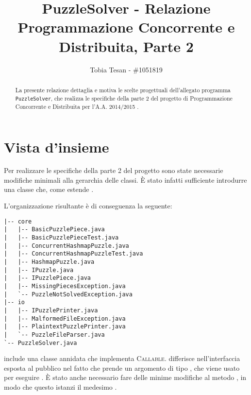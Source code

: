 \documentclass[a4paper]{article}
\title{PuzzleSolver - Relazione Programmazione Concorrente e Distribuita, Parte 2}
\author{Tobia Tesan - \#1051819}
\newcommand{\Ifacename}[1]{\textsc{#1}}
\begin{document}
\maketitle

\begin{abstract}
La presente relazione dettaglia e motiva le scelte progettuali dell'allegato programma \texttt{PuzzleSolver}, che realizza le specifiche della parte 2 del progetto di Programmazione Concorrente e Distribuita per l'A.A. 2014/2015 \cite{prspec}.
\end{abstract}

\tableofcontents

\section{Vista d'insieme}

Per realizzare le specifiche della parte 2 del progetto sono state necessarie modifiche minimali alla gerarchia delle classi.
\`E stato infatti sufficiente introdurre una classe  che, come  estende .

L'organizzazione risultante \`e di conseguenza la seguente:

\begin{verbatim}
|-- core
|   |-- BasicPuzzlePiece.java
|   |-- BasicPuzzlePieceTest.java
|   |-- ConcurrentHashmapPuzzle.java
|   |-- ConcurrentHashmapPuzzleTest.java
|   |-- HashmapPuzzle.java
|   |-- IPuzzle.java
|   |-- IPuzzlePiece.java
|   |-- MissingPiecesException.java
|   `-- PuzzleNotSolvedException.java
|-- io
|   |-- IPuzzlePrinter.java
|   |-- MalformedFileException.java
|   |-- PlaintextPuzzlePrinter.java
|   `-- PuzzleFileParser.java
`-- PuzzleSolver.java
\end{verbatim}

 include una classe annidata  che implementa \Ifacename{Callable}.
 differisce nell'interfaccia esposta al pubblico nel fatto che prende un argomento di tipo , che viene usato per eseguire .
\`E stato anche necessario fare delle minime modifiche al metodo , in modo che questo istanzi il medesimo .

\section{}
\end{document}
